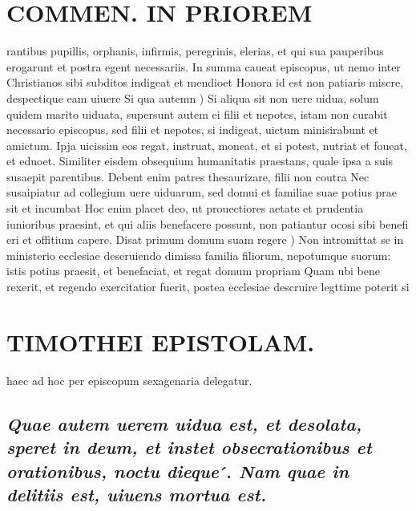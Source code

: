 \documentclass{article}
\begin{document}
\begin{pages}
\section*{COMMEN. IN PRIOREM }
\marginpar{[ p.118 ]}\pstart rantibus pupillis, orphanis, infirmis, peregrinis, elerias, et qui sua pauperibus erogarunt et postra egent necessariis. In summa caueat episcopus, ut nemo inter Christianos sibi subditos indigeat et mendioet Honora id est non patiaris miscre, despectique eam uiuere  \pend\pstart Si qua autemn ) Si aliqua sit non uere uidua, solum quidem marito uiduata, supersunt autem ei filii et nepotes, istam non curabit necessario episcopus, sed filii et nepotes, si indigeat, uictum minisirabunt et amictum. Ipja uicissim eos regat, instruat, moneat, et si potest, nutriat et foueat, et eduoet. Similiter eisdem obsequium humanitatis praestans, quale ipsa a suis susaepit parentibus. Debent enim patres thesaurizare, filii non coutra Nec susaipiatur ad collegium uere uiduarum, sed domui et familiae suae potius prae sit et incumbat Hoc enim placet deo, ut prouectiores aetate et prudentia iunioribus praesint, et qui aliis benefacere possunt, non patiantur ocosi sibi benefi eri et offitium capere.  \pend\pstart Disat primum domum suam regere ) Non intromittat se in ministerio ecclesiae deseruiendo dimissa familia filiorum, nepotumque suorum: istis potius praesit, et benefaciat, et regat domum propriam Quam ubi bene rexerit, et regendo exercitatior fuerit, postea ecclesiae descruire legttime poterit si  \pend
\section*{TIMOTHEI EPISTOLAM. }
\marginpar{[ p.119 ]}\pstart haec ad hoc per episcopum sexagenaria delegatur.  \pend
{}
{}
\subsection*{\textit{Quae autem uerem uidua est, et desolata, speret in deum, et instet obsecrationibus et orationibus, noctu dieque ́. Nam quae in delitiis est, uiuens mortua est. }}
{}

\end{pages}
\end{document}
